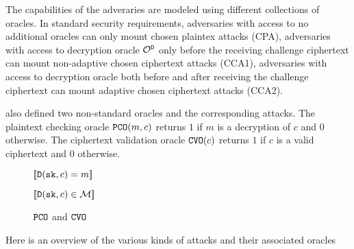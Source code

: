 \documentclass{article}
\begin{document}
The capabilities of the adveraries are modeled using different collections of oracles. In standard security requirements, adversaries with access to no additional oracles can only mount chosen plaintex attacks (CPA), adversaries with access to decryption oracle $\mathcal{O}^\texttt{D}$ only before the receiving challenge ciphertext can mount non-adaptive chosen ciphertext attacks (CCA1), adversaries with access to decryption oracle both before and after receiving the challenge ciphertext can mount adaptive chosen ciphertext attacks (CCA2).

\cite{hofheinz2017modular} also defined two non-standard oracles and the corresponding attacks. The plaintext checking oracle $\pco(m, c)$ returns $1$ if $m$ is a decryption of $c$ and $0$ otherwise. The ciphertext validation oracle $\cvo(c)$ returns $1$ if $c$ is a valid ciphertext and $0$ otherwise.

\begin{figure}[H]
    \center

    \begin{minipage}{0.49\textwidth}
        \begin{algorithm}[H]
            \caption{$\pco(m, c)$}\label{alg:pco}
            \begin{algorithmic}
                \State \Return $[\![ \texttt{D}(\texttt{sk}, c) = m ]\!]$
            \end{algorithmic}
        \end{algorithm}
    \end{minipage}
    \hfill
    \begin{minipage}{0.49\textwidth}
        \begin{algorithm}[H]
            \caption{$\cvo(c)$}\label{alg:cvo}
            \begin{algorithmic}[1]
                \State \Return $[\![ \texttt{D}(\texttt{sk}, c) \in \mathcal{M} ]\!]$
            \end{algorithmic}
        \end{algorithm}
    \end{minipage}

    \caption{$\texttt{PCO}$ and $\texttt{CVO}$}\label{fig:pco-and-cvo}
\end{figure}

Here is an overview of the various kinds of attacks and their associated oracles
\end{document}

